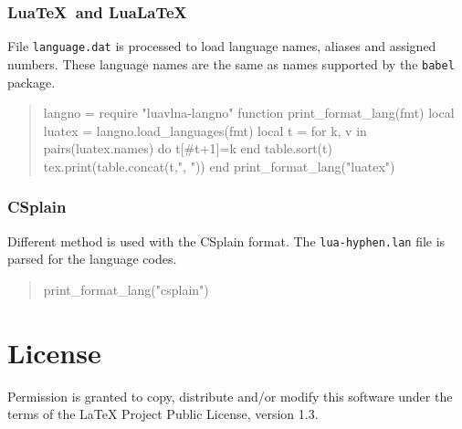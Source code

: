 \documentclass[12pt]{ltxdoc}
\begin{document}
\subsubsection{Lua\TeX\ and Lua\LaTeX}

File \verb|language.dat| is processed to load language names, aliases and assigned numbers. These language names are the same as names supported by the \verb|babel| package.

\begin{quotation}
  \small\noindent
\begin{luacode*}
  langno = require "luavlna-langno"
  function print_format_lang(fmt)
    local luatex = langno.load_languages(fmt)
    local t = {}
    for k, v in pairs(luatex.names) do
      t[#t+1]=k
    end
    table.sort(t)
    tex.print(table.concat(t,", "))
  end
  print_format_lang("luatex")
\end{luacode*}
\end{quotation}

\subsubsection{CSplain}

Different method is used with the CSplain format. The \verb|lua-hyphen.lan| file is parsed for the language codes.

\begin{quotation}
  \small\noindent
  \begin{luacode*}
    print_format_lang("csplain")
  \end{luacode*}
\end{quotation}


\section{License}

Permission is granted to copy, distribute and/or modify this software
under the terms of the LaTeX Project Public License, version 1.3.
\end{document}
